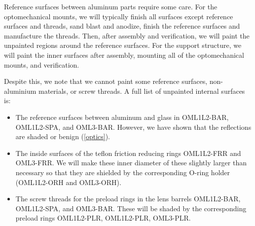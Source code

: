 \documentclass{article}
\begin{document}
Reference surfaces between aluminum parts require some care. For the optomechanical mounts, we will typically finish all surfaces except reference surfaces and threads, sand blast and anodize, finish the reference surfaces and manufacture the threads. Then, after assembly and verification, we will paint the unpainted regions around the reference surfaces. For the support structure, we will paint the inner surfaces after assembly, mounting all of the optomechanical mounts, and verification.

Despite this, we note that we cannot paint some reference surfaces, non-aluminium materials, or screw threads. A full list of unpainted internal surfaces is:

\begin{itemize}
\item
The reference surfaces between aluminum and glass in OML1L2-BAR, OML1L2-SPA, and OML3-BAR. However, we have shown that the reflections are shaded or benign (\ref{optics}).
\item
The inside surfaces of the teflon friction reducing rings OML1L2-FRR and OML3-FRR. We will make these inner diameter of these slightly larger than necessary so that they are shielded by the corresponding O-ring holder (OML1L2-ORH and OML3-ORH).
\item
The screw threads for the preload rings in the lens barrels OML1L2-BAR, OML1L2-SPA, and OML3-BAR. These will be shaded by the corresponding preload rings OML1L2-PLR, OML1L2-PLR, OML3-PLR.
\end{itemize}
\end{document}
